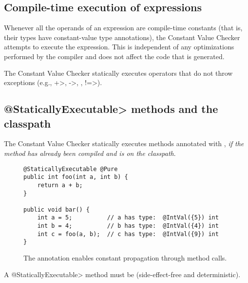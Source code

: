 \ifonbuffalo{\relax}\fi

\subsection{Compile-time execution of expressions\label{constant-value-compile-time-execution}}

Whenever all the operands of an expression are compile-time constants (that
is, their types have constant-value type annotations), the Constant Value
Checker attempts to execute the expression.  This is independent of any
optimizations performed by the compiler and does not affect the code that
is generated.

The Constant Value Checker statically executes operators that do
not throw exceptions (e.g., \<+>, \<->, \code{<\relax<}, \<!=>).


\subsection{\<@StaticallyExecutable> methods and the classpath\label{constant-value-staticallyexecutable-annotation}}

The Constant Value Checker statically executes methods annotated with
, \emph{if the
method has already been compiled and is on the classpath}.

\begin{figure}
\begin{Verbatim}
@StaticallyExecutable @Pure
public int foo(int a, int b) {
    return a + b;
}

public void bar() {
    int a = 5;          // a has type:  @IntVal({5}) int
    int b = 4;          // b has type:  @IntVal({4}) int
    int c = foo(a, b);  // c has type:  @IntVal({9}) int
}
\end{Verbatim}
\caption{The
   annotation enables
  constant propagation through method calls.}
\label{fig-staticallyexecutable}
\end{figure}

A \<@StaticallyExecutable> method must
be  (side-effect-free and
deterministic).

